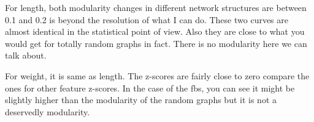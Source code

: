 For length, both modularity changes in different network structures are between 0.1 and 0.2 is beyond the resolution of what I can do. These two curves are almost identical in the statistical point of view. Also they are close to what you would get for totally random graphs in fact. There is no modularity here we can talk about.

For weight, it is same as length. The z-scores are fairly close to zero compare the ones for other feature z-scores. In the case of the fbs, you can see it might be slightly higher than the modularity of the random graphs but it is not a deservedly modularity.